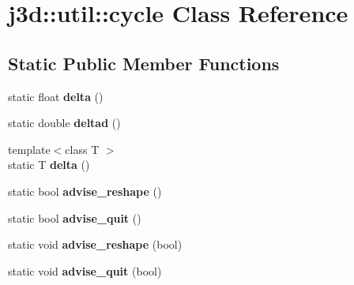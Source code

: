 \hypertarget{classj3d_1_1util_1_1cycle}{}\section{j3d\+:\+:util\+:\+:cycle Class Reference}
\label{classj3d_1_1util_1_1cycle}
\subsection*{Static Public Member Functions}
\begin{DoxyCompactItemize}
\item 
\hypertarget{classj3d_1_1util_1_1cycle_a3c9eb089570f6897eb7e303679a6a867}{}static float {\bfseries delta} ()\label{classj3d_1_1util_1_1cycle_a3c9eb089570f6897eb7e303679a6a867}

\item 
\hypertarget{classj3d_1_1util_1_1cycle_a9ed1e1d22182bac0404f52ab2083c0f3}{}static double {\bfseries deltad} ()\label{classj3d_1_1util_1_1cycle_a9ed1e1d22182bac0404f52ab2083c0f3}

\item 
\hypertarget{classj3d_1_1util_1_1cycle_a85dc3fdc4ede3888741a1960922959c4}{}{\footnotesize template$<$class T $>$ }\\static T {\bfseries delta} ()\label{classj3d_1_1util_1_1cycle_a85dc3fdc4ede3888741a1960922959c4}

\item 
\hypertarget{classj3d_1_1util_1_1cycle_a2de071a89920dd94d1a95a07011f9c83}{}static bool {\bfseries advise\+\_\+reshape} ()\label{classj3d_1_1util_1_1cycle_a2de071a89920dd94d1a95a07011f9c83}

\item 
\hypertarget{classj3d_1_1util_1_1cycle_ac13cb8285c8733e94549b8d271bc2cef}{}static bool {\bfseries advise\+\_\+quit} ()\label{classj3d_1_1util_1_1cycle_ac13cb8285c8733e94549b8d271bc2cef}

\item 
\hypertarget{classj3d_1_1util_1_1cycle_a6262059e5700e2b53cd368837a9db1a7}{}static void {\bfseries advise\+\_\+reshape} (bool)\label{classj3d_1_1util_1_1cycle_a6262059e5700e2b53cd368837a9db1a7}

\item 
\hypertarget{classj3d_1_1util_1_1cycle_aedf7800808af7d2feaff0c739fd42e06}{}static void {\bfseries advise\+\_\+quit} (bool)\label{classj3d_1_1util_1_1cycle_aedf7800808af7d2feaff0c739fd42e06}

\end{DoxyCompactItemize}
